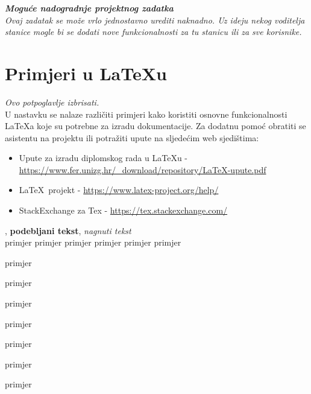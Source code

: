 		\textbf{\textit{Moguće nadogradnje projektnog zadatka}}\\
		\textit{Ovaj zadatak se može vrlo jednostavno urediti naknadno. Uz ideju nekog voditelja stanice mogle bi se dodati nove funkcionalnosti za tu stanicu ili za sve korisnike.}
		
		
		\eject
		
		
		
		\section{Primjeri u \LaTeX u}
		
		\textit{Ovo potpoglavlje izbrisati.}\\

		U nastavku se nalaze različiti primjeri kako koristiti osnovne funkcionalnosti \LaTeX a koje su potrebne za izradu dokumentacije. Za dodatnu pomoć obratiti se asistentu na projektu ili potražiti upute na sljedećim web sjedištima:
		\begin{itemize}
			\item Upute za izradu diplomskog rada u \LaTeX u - \url{https://www.fer.unizg.hr/_download/repository/LaTeX-upute.pdf}
			\item \LaTeX\ projekt - \url{https://www.latex-project.org/help/}
			\item StackExchange za Tex - \url{https://tex.stackexchange.com/}\\
		
		\end{itemize} 	


		
		\noindent {}, \textbf{podebljani tekst}, 	\textit{nagnuti tekst}\\
		\noindent \normalsize primjer \large primjer \Large primjer \LARGE {primjer} \huge {primjer} \Huge primjer \normalsize
				
		\begin{packed_item}
			
			\item  primjer
			\item  primjer
			\item  primjer
			\item[] \begin{packed_enum}
				\item primjer
				\item[] \begin{packed_enum}
					\item[1.a] primjer
					\item[b] primjer
				\end{packed_enum}
				\item primjer
			\end{packed_enum}
			
		\end{packed_item}
		
